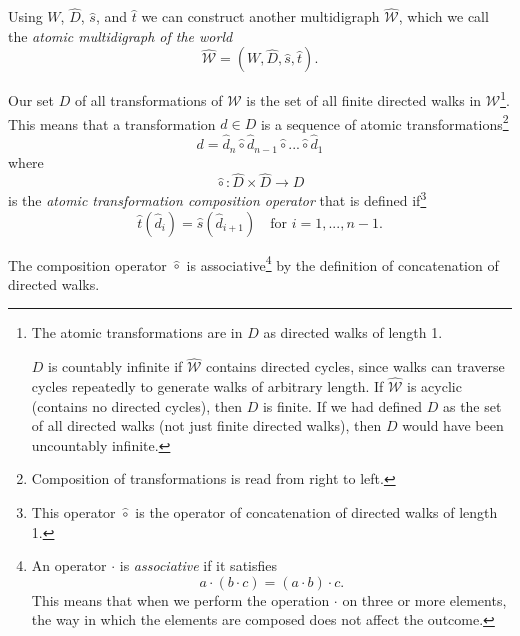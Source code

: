 Using $W$, $\hat{D}$, $\hat{s}$, and $\hat{t}$ we can construct another multidigraph $\hat{\mathscr{W}}$, which we call the \emph{atomic multidigraph of the world}
\begin{equation}
	\hat{\mathscr{W}} = (W, \hat{D}, \hat{s}, \hat{t}).
\end{equation}

Our set $D$ of all transformations of $\mathscr{W}$ is the set of all finite directed walks in $\mathscr{W}$\footnote{
    The atomic transformations are in $D$ as directed walks of length 1.

    $D$ is countably infinite if $\hat{\mathscr{W}}$ contains directed cycles, since walks can traverse cycles repeatedly to generate walks of arbitrary length.
    If $\hat{\mathscr{W}}$ is acyclic (contains no directed cycles), then $D$ is finite.
    If we had defined $D$ as the set of all directed walks (not just finite directed walks), then $D$ would have been uncountably infinite.
}.
This means that a transformation $d \in D$ is a sequence of atomic transformations\footnote{
	Composition of transformations is read from right to left.
}
\begin{equation}
	d = \hat{d}_{n} \hat{\circ} \hat{d}_{n-1} \hat{\circ} ... \hat{\circ} \hat{d}_{1}
\end{equation}
where
\begin{equation}
	\hat{\circ}: \hat{D} \times \hat{D} \to D
\end{equation}
is the \emph{atomic transformation composition operator} that is defined if\footnote{
This operator $\hat{\circ}$ is the operator of concatenation of directed walks of length 1.
}
\begin{equation}
	\hat{t}(\hat{d}_{i}) = \hat{s}(\hat{d}_{i+1}) \quad \text{for $i = 1, ..., n-1$}.
\end{equation}

\begin{corollary}
    The composition operator $\hat{\circ}$ is associative\footnote{
    An operator $\cdot$ is \emph{associative} if it satisfies
    \begin{equation}
    	a \cdot (b \cdot c) = (a \cdot b) \cdot c.
    \end{equation}
    This means that when we perform the operation $\cdot$ on three or more elements, the way in which the elements are composed does not affect the outcome.
    }
    by the definition of concatenation of directed walks.
\end{corollary}

